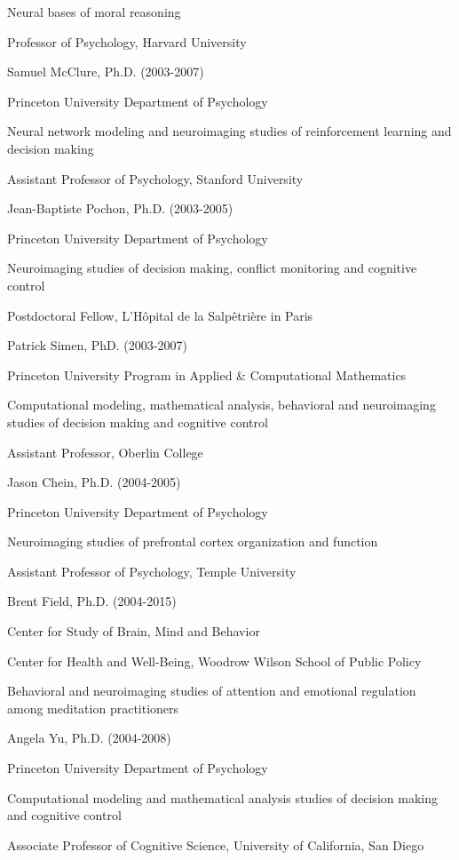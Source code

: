 \documentclass[10 pt]{article}
\begin{document}
Neural bases of moral reasoning

Professor of Psychology, Harvard University
    \medskip

Samuel McClure, Ph.D. (2003-2007)

Princeton University Department of Psychology

Neural network modeling and neuroimaging studies of reinforcement learning and decision making

Assistant Professor of Psychology, Stanford University
    \medskip

Jean-Baptiste Pochon, Ph.D. (2003-2005)

Princeton University Department of Psychology

Neuroimaging studies of decision making, conflict monitoring and cognitive control

Postdoctoral Fellow, L'Hôpital de la Salpêtrière in Paris
    \medskip

Patrick Simen, PhD. (2003-2007)

Princeton University Program in Applied \& Computational Mathematics

Computational modeling, mathematical analysis, behavioral and neuroimaging studies of decision making and cognitive control

Assistant Professor, Oberlin College
    \medskip

Jason Chein, Ph.D. (2004-2005)

Princeton University Department of Psychology

Neuroimaging studies of prefrontal cortex organization and function

Assistant Professor of Psychology, Temple University
    \medskip

Brent Field, Ph.D. (2004-2015)

Center for Study of Brain, Mind and Behavior

Center for Health and Well-Being, Woodrow Wilson School of Public Policy

Behavioral and neuroimaging studies of attention and emotional regulation among meditation practitioners
    \medskip

Angela Yu, Ph.D. (2004-2008)

Princeton University Department of Psychology

Computational modeling and mathematical analysis studies of decision making and cognitive control

Associate Professor of Cognitive Science, University of California, San Diego
    \medskip
\end{document}
